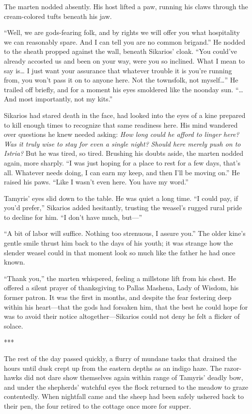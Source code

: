 The marten nodded absently. His host lifted a paw, running his claws through the cream-colored tufts beneath his jaw.

``Well, we are gods-fearing folk, and by rights we will offer you what hospitality we can reasonably spare. And I can tell you are no common brigand.'' He nodded to the sheath propped against the wall, beneath Sikarios' cloak. ``You could've already accosted us and been on your way, were you so inclined. What I mean to say is\ldots{} I just want your assurance that whatever trouble it is you're running from, you won't pass it on to anyone here. Not the townsfolk, not myself\ldots'' He trailed off briefly, and for a moment his eyes smoldered like the noonday sun. ``\ldots And most importantly, not my kits.''

Sikarios had stared death in the face, had looked into the eyes of a kine prepared to kill enough times to recognize that same readiness here. His mind wandered over questions he knew needed asking: \emph{How long could he afford to linger here? Was it truly wise to stay for even a single night?} \emph{Should here merely push on to Istria?} But he was tired, so tired. Brushing his doubts aside, the marten nodded again, more sharply. ``I was just hoping for a place to rest for a few days, that's all. Whatever needs doing, I can earn my keep, and then I'll be moving on.'' He raised his paws. ``Like I wasn't even here. You have my word.''

Tamyris' eyes slid down to the table. He was quiet a long time. ``I could pay, if you'd prefer,'' Sikarios added hesitantly, trusting the weasel's rugged rural pride to decline for him. ``I don't have much, but---''

``A bit of labor will suffice. Nothing too strenuous, I assure you.'' The older kine's gentle smile thrust him back to the days of his youth; it was strange how the slender weasel could in that moment look so much like the father he had once known.

``Thank you,'' the marten whispered, feeling a millstone lift from his chest. He offered a silent prayer of thanksgiving to Pallas Mashena, Lady of Wisdom, his former patron. It was the first in months, and despite the fear festering deep within his heart---that the gods had forsaken him, that the best he could hope for was to avoid their notice altogether---Sikarios could not deny he felt a flicker of solace.

***

The rest of the day passed quickly, a flurry of mundane tasks that drained the hours until dusk crept up from the eastern depths as an indigo haze. The razor-hawks did not dare show themselves again within range of Tamyris' deadly bow, and under the shepherds' watchful eyes the flock returned to the meadow to graze contentedly. When nightfall came and the sheep had been safely ushered back to their pen, the four retired to the cottage once more for supper.

